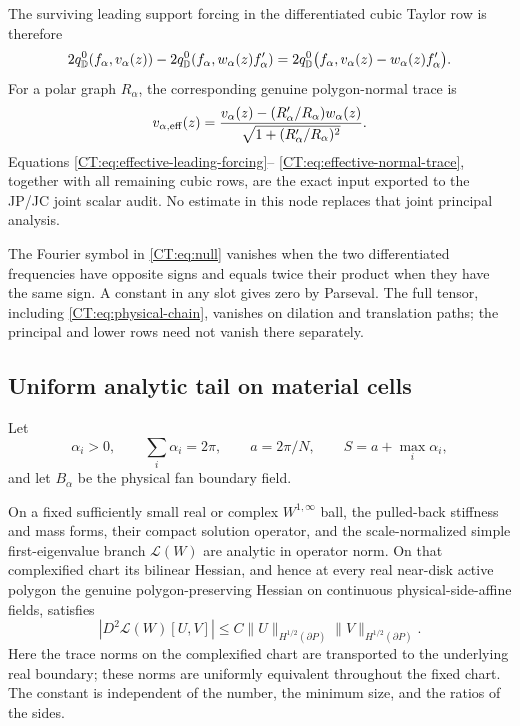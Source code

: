 The surviving leading support forcing in the differentiated cubic Taylor
row is therefore
\begin{equation}\label{CT:eq:effective-leading-forcing}
 2q_{\mathbb D}^{0}(f_\alpha,v_\alpha(z))
 -2q_{\mathbb D}^{0}(f_\alpha,w_\alpha(z)f_\alpha')
 =2q_{\mathbb D}^{0}\bigl(f_\alpha,
     v_\alpha(z)-w_\alpha(z)f_\alpha'\bigr).
\end{equation}
For a polar graph $R_\alpha$, the corresponding genuine polygon-normal
trace is
\begin{equation}\label{CT:eq:effective-normal-trace}
 v_{\alpha,{\rm eff}}(z)
 =\frac{v_\alpha(z)-(R_\alpha'/R_\alpha)w_\alpha(z)}
        {\sqrt{1+(R_\alpha'/R_\alpha)^2}}.
\end{equation}
Equations \eqref{CT:eq:effective-leading-forcing}--
\eqref{CT:eq:effective-normal-trace}, together with all remaining cubic rows,
are the exact input exported to the JP/JC joint scalar audit.  No estimate
in this node replaces that joint principal analysis.

\begin{remark}
The Fourier symbol in \eqref{CT:eq:null} vanishes when the two differentiated
frequencies have opposite signs and equals twice their product when they
have the same sign.  A constant in any slot gives zero by Parseval.  The
full tensor, including \eqref{CT:eq:physical-chain}, vanishes on dilation and
translation paths; the principal and lower rows need not vanish there
separately.
\end{remark}

\subsection{Uniform analytic tail on material cells}
\label{CT:sec:material}

Let
\begin{equation}\label{CT:eq:fan}
 \alpha_i>0,\qquad \sum_i\alpha_i=2\pi,\qquad
 a=2\pi/N,\qquad S=a+\max_i\alpha_i,
\end{equation}
and let $B_\alpha$ be the physical fan boundary field.

\begin{theorem}
\label{CT:thm:fixed-chart-unconditional}
On a fixed sufficiently small real or complex $W^{1,\infty}$ ball, the
pulled-back stiffness and mass forms, their compact solution operator, and
the scale-normalized simple first-eigenvalue branch $\mathcal L(W)$ are
analytic in operator norm.  On that complexified chart its bilinear
Hessian, and hence at every real near-disk active polygon the genuine
polygon-preserving Hessian on continuous physical-side-affine fields,
satisfies
\begin{equation}\label{CT:eq:polygon-natural-Hessian}
 |D^2\mathcal L(W)[U,V]|
 \le C\|U\|_{H^{1/2}(\partial P)}
       \|V\|_{H^{1/2}(\partial P)}.
\end{equation}
Here the trace norms on the complexified chart are transported to the
underlying real boundary; these norms are uniformly equivalent throughout
the fixed chart.
The constant is independent of the number, the minimum size, and the
ratios of the sides.
\end{theorem}

